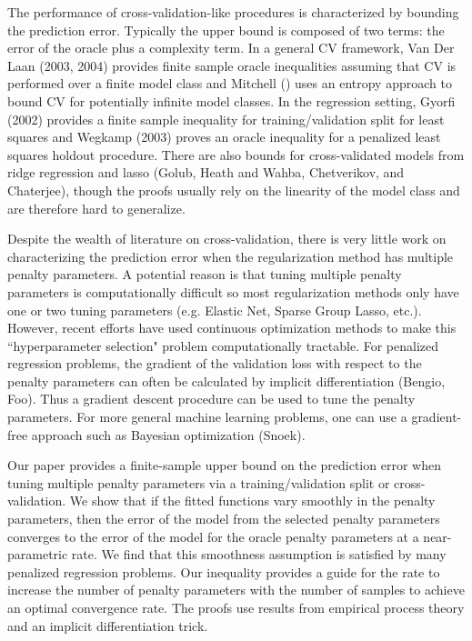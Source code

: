 \documentclass[12pt]{article}
\begin{document}
The performance of cross-validation-like procedures is characterized by bounding the prediction error. Typically the upper bound is composed of two terms: the error of the oracle plus a complexity term. In a general CV framework, Van Der Laan (2003, 2004) provides finite sample oracle inequalities assuming that CV is performed over a finite model class and Mitchell () uses an entropy approach to bound CV for potentially infinite model classes. In the regression setting, Gyorfi (2002) provides a finite sample inequality for training/validation split for least squares and Wegkamp (2003) proves an oracle inequality for a penalized least squares holdout procedure. There are also bounds for cross-validated models from ridge regression and lasso (Golub, Heath and Wahba, Chetverikov, and Chaterjee), though the proofs usually rely on the linearity of the model class and are therefore hard to generalize.

Despite the wealth of literature on cross-validation, there is very little work on characterizing the prediction error when the regularization method has multiple penalty parameters. A potential reason is that tuning multiple penalty parameters is computationally difficult so most regularization methods only have one or two tuning parameters (e.g. Elastic Net, Sparse Group Lasso, etc.). However, recent efforts have used continuous optimization methods to make this ``hyperparameter selection" problem computationally tractable. For penalized regression problems, the gradient of the validation loss with respect to the penalty parameters can often be calculated by implicit differentiation (Bengio, Foo). Thus a gradient descent procedure can be used to tune the penalty parameters. For more general machine learning problems, one can use a gradient-free approach such as Bayesian optimization (Snoek). 

Our paper provides a finite-sample upper bound on the prediction error when tuning multiple penalty parameters via a training/validation split or cross-validation. We show that if the fitted functions vary smoothly in the penalty parameters, then the error of the model from the selected penalty parameters converges to the error of the model for the oracle penalty parameters at a near-parametric rate. We find that this smoothness assumption is satisfied by many penalized regression problems. Our inequality provides a guide for the rate to increase the number of penalty parameters with the number of samples to achieve an optimal convergence rate. The proofs use results from empirical process theory and an implicit differentiation trick.
\end{document}
